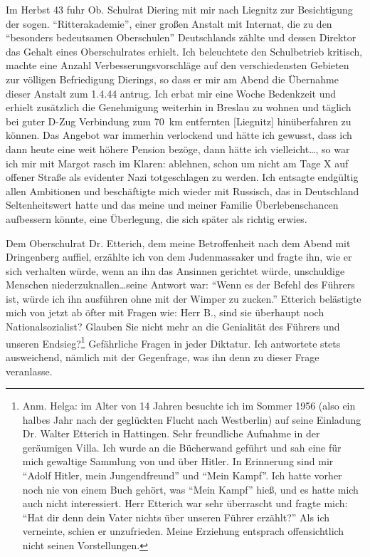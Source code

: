 \documentclass[a5paper,pagesize,10pt,twoside=true]{scrbook}
\renewcommand{\marginpar}[2][]{}
\begin{document}
Im Herbst 43 fuhr Ob. Schulrat Diering mit mir nach Liegnitz zur Besichtigung der sogen. \enquote{Ritterakademie}, einer großen Anstalt mit Internat, die zu den \enquote{besonders bedeutsamen Oberschulen} Deutschlands zählte und dessen Direktor das Gehalt eines Oberschulrates erhielt. Ich beleuchtete den Schulbetrieb kritisch, machte eine Anzahl Verbesserungsvorschläge auf den verschiedensten Gebieten zur völligen Befriedigung Dierings, so dass er mir am Abend die Übernahme dieser Anstalt zum 1.4.44 antrug. Ich erbat mir eine Woche Bedenkzeit und erhielt zusätzlich die Genehmigung weiterhin in Breslau zu wohnen und täglich bei guter D-Zug Verbindung zum 70~km entfernten [Liegnitz] hinüberfahren zu können. Das Angebot \marginpar{40} war immerhin verlockend und hätte ich gewusst, dass ich dann heute eine weit höhere Pension bezöge, dann hätte ich vielleicht\dots, so war ich mir mit Margot rasch im Klaren: ablehnen, schon um nicht am Tage X auf offener Straße als evidenter Nazi totgeschlagen zu werden. Ich entsagte endgültig allen Ambitionen und beschäftigte mich wieder mit Russisch, das in Deutschland Seltenheitswert hatte und das meine und meiner Familie Überlebenschancen aufbessern könnte, eine Überlegung, die sich später als richtig erwies.

Dem Oberschulrat Dr. Etterich, dem meine Betroffenheit nach dem Abend mit Dringenberg auffiel, erzählte ich von dem Judenmassaker und fragte ihn, wie er sich verhalten würde, wenn an ihn das Ansinnen gerichtet würde, unschuldige Menschen niederzuknallen\dots seine Antwort war: \enquote{Wenn es der Befehl des Führers ist, würde ich ihn ausführen ohne mit der Wimper zu zucken.} Etterich belästigte mich von jetzt ab öfter mit Fragen wie: Herr B., sind sie überhaupt noch Nationalsozialist? Glauben Sie nicht mehr an die Genialität des Führers und unseren Endsieg?\footnote{Anm. Helga: im Alter von 14 Jahren besuchte ich im Sommer 1956 (also ein halbes Jahr nach der geglückten Flucht nach Westberlin) auf seine Einladung Dr. Walter Etterich in Hattingen. Sehr freundliche Aufnahme in der geräumigen Villa. Ich wurde an die Bücherwand geführt und sah eine für mich gewaltige Sammlung von und über Hitler. In Erinnerung sind mir \enquote{Adolf Hitler, mein Jungendfreund} und \enquote{Mein Kampf}. Ich hatte vorher noch nie von einem Buch gehört, was \enquote{Mein Kampf} hieß, und es hatte mich auch nicht interessiert. Herr Etterich war sehr überrascht und fragte mich: \enquote{Hat dir denn dein Vater nichts über unseren Führer erzählt?} Als ich verneinte, schien er unzufrieden. Meine Erziehung entsprach offensichtlich nicht seinen Vorstellungen.}\marginpar{41} Gefährliche Fragen in jeder Diktatur. Ich antwortete stets ausweichend, nämlich mit der Gegenfrage, was ihn denn zu dieser Frage veranlasse.
\end{document}
